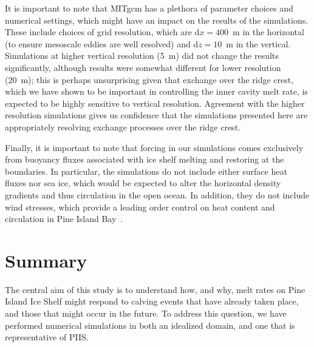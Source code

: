 \documentclass[draft]{agujournal2019}
\begin{document}
It is important to note that MITgcm has a plethora of parameter choices and numerical settings, which might have an impact on the results of the simulations. These include choices of grid resolution, which are $\mathrm{d}x = 400$~m in the horizontal (to ensure mesoscale eddies are well resolved) and  $\mathrm{d}z = 10$~m in the vertical. Simulations at higher vertical resolution (5~m) did not change the results significantly, although results were somewhat different for lower resolution (20~m); this is perhaps unsurprising given that exchange over the ridge crest, which we have shown to be important in controlling the inner cavity melt rate, is expected to be highly sensitive to vertical resolution. Agreement with the higher resolution simulations gives us confidence that the simulations presented here are appropriately resolving exchange processes over the ridge crest.


Finally, it is important to note that forcing in our simulations comes exclusively from buoyancy fluxes associated with ice shelf melting and restoring at the boundaries. In particular, the simulations do not include either surface heat fluxes nor sea ice, which would be expected to alter the horizontal density gradients and thus circulation in the open ocean. In addition, they do not include wind stresses, which provide a leading order control on heat content and circulation in Pine Island Bay~\cite{Dutrieux2014Science}.

\section{Summary}\label{S:Summary}
The central aim of this study is to understand how, and why, melt rates on Pine Island Ice Shelf might respond to calving events that have already taken place, and those that might occur in the future. To address this question, we have performed numerical simulations in both an idealized domain, and one that is representative of PIIS.
\end{document}
